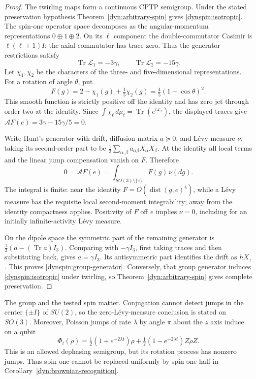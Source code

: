 \documentclass[reqno]{amsart}
\theoremstyle{definition}
\theoremstyle{remark}
\DeclareMathOperator{\Tr}{Tr}
\DeclareMathOperator{\dist}{dist}
\begin{document}
\begin{proof}
The twirling maps form a continuous CPTP semigroup.  Under the stated
preservation hypothesis Theorem~\ref{dyn:arbitrary-spin} gives
\eqref{dynspin:isotropic}.  The spin-one operator space decomposes as
the angular-momentum representations $0\oplus1\oplus2$.  On its
$\ell$ component the double-commutator Casimir is $\ell(\ell+1)I$;
the axial commutator has trace zero.  Thus the generator restrictions
satisfy
\[
 \Tr\mathcal L_1=-3\gamma,\qquad \Tr\mathcal L_2=-15\gamma.
\]
Let $\chi_1,\chi_2$ be the characters of the three- and five-dimensional
representations.  For a rotation of angle $\theta$, put
\begin{equation}\label{dynspin:character-witness}
 F(g)=2-\chi_1(g)+\tfrac15\chi_2(g)
     =\tfrac45(1-\cos\theta)^2.
\end{equation}
This smooth function is strictly positive off the identity and has
zero jet through order two at the identity.  Since
$\int\chi_\ell\,d\mu_t=\Tr(e^{t\mathcal L_\ell})$, the displayed
traces give $\mathcal AF(e)=3\gamma-15\gamma/5=0$.

Write Hunt's generator with drift, diffusion matrix $a\succeq0$, and
L\'evy measure $\nu$, taking its second-order part to be
$\tfrac12\sum_{\alpha,\beta}a_{\alpha\beta}X_\alpha X_\beta$.
At the identity all local terms and the linear jump compensation
vanish on $F$.  Therefore
\[
 0=\mathcal AF(e)=\int_{SO(3)\setminus\{e\}}F(g)\,\nu(dg).
\]
The integral is finite: near the identity $F=O(\dist(g,e)^4)$, while
a L\'evy measure has the requisite local second-moment integrability;
away from the identity compactness applies.  Positivity of $F$ off
$e$ implies $\nu=0$, including for an initially infinite-activity
L\'evy measure.

On the dipole space the symmetric part of the remaining generator is
$\tfrac12(a-(\Tr a)I_3)$.  Comparing with $-\gamma I_3$, first taking
traces and then substituting back, gives $a=\gamma I_3$.  Its
antisymmetric part identifies the drift as $hX_z$.  This proves
\eqref{dynspin:group-generator}.  Conversely, that group generator
induces \eqref{dynspin:isotropic} under twirling, so
Theorem~\ref{dyn:arbitrary-spin} gives complete preservation.
\end{proof}

The group and the tested spin matter.  Conjugation cannot detect jumps
in the center $\{\pm I\}$ of $SU(2)$, so the zero-L\'evy-measure
conclusion is stated on $SO(3)$.  Moreover, Poisson jumps of rate
$\lambda$ by angle $\pi$ about the $z$ axis induce on a qubit
\[
 \Phi_t(\rho)=\tfrac12(1+e^{-2\lambda t})\rho
              +\tfrac12(1-e^{-2\lambda t})Z\rho Z.
\]
This is an allowed dephasing semigroup, but its rotation process has
nonzero jumps.  Thus spin one cannot be replaced uniformly by spin
one-half in Corollary~\ref{dyn:brownian-recognition}.
\end{document}
